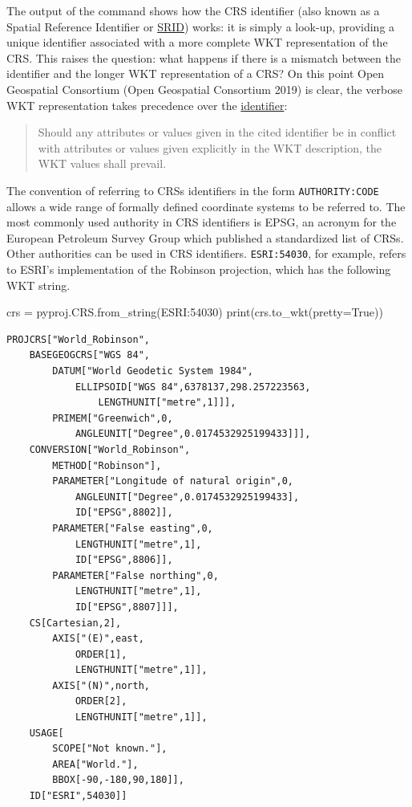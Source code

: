 \documentclass[
  letterpaper,
]{krantz}
\newenvironment{Shaded}{\begin{snugshade}}{\end{snugshade}}
\newcommand{\BuiltInTok}[1]{\textcolor[rgb]{0.00,0.23,0.31}{#1}}
\newcommand{\NormalTok}[1]{\textcolor[rgb]{0.00,0.23,0.31}{#1}}
\newcommand{\OperatorTok}[1]{\textcolor[rgb]{0.37,0.37,0.37}{#1}}
\newcommand{\StringTok}[1]{\textcolor[rgb]{0.13,0.47,0.30}{#1}}
\newcommand{\VariableTok}[1]{\textcolor[rgb]{0.07,0.07,0.07}{#1}}
\begin{document}
The output of the command shows how the CRS identifier (also known as a
Spatial Reference Identifier or
\href{https://postgis.net/workshops/postgis-intro/projection.html}{SRID})
works: it is simply a look-up, providing a unique identifier associated
with a more complete WKT representation of the CRS. This raises the
question: what happens if there is a mismatch between the identifier and
the longer WKT representation of a CRS? On this point Open Geospatial
Consortium (Open Geospatial Consortium 2019) is clear, the verbose WKT
representation takes precedence over the
\href{https://docs.opengeospatial.org/is/18-010r7/18-010r7.html\#37}{identifier}:

\begin{quote}
Should any attributes or values given in the cited identifier be in
conflict with attributes or values given explicitly in the WKT
description, the WKT values shall prevail.
\end{quote}

The convention of referring to CRSs identifiers in the form
\texttt{AUTHORITY:CODE} allows a wide range of formally defined
coordinate systems to be referred to. The most commonly used authority
in CRS identifiers is EPSG, an acronym for the European Petroleum Survey
Group which published a standardized list of CRSs. Other authorities can
be used in CRS identifiers. \texttt{ESRI:54030}, for example, refers to
ESRI's implementation of the Robinson projection, which has the
following WKT string.

\begin{Shaded}
\begin{Highlighting}[]
\NormalTok{crs }\OperatorTok{=}\NormalTok{ pyproj.CRS.from\_string(}\StringTok{\textquotesingle{}ESRI:54030\textquotesingle{}}\NormalTok{)}
\BuiltInTok{print}\NormalTok{(crs.to\_wkt(pretty}\OperatorTok{=}\VariableTok{True}\NormalTok{))}
\end{Highlighting}
\end{Shaded}

\begin{verbatim}
PROJCRS["World_Robinson",
    BASEGEOGCRS["WGS 84",
        DATUM["World Geodetic System 1984",
            ELLIPSOID["WGS 84",6378137,298.257223563,
                LENGTHUNIT["metre",1]]],
        PRIMEM["Greenwich",0,
            ANGLEUNIT["Degree",0.0174532925199433]]],
    CONVERSION["World_Robinson",
        METHOD["Robinson"],
        PARAMETER["Longitude of natural origin",0,
            ANGLEUNIT["Degree",0.0174532925199433],
            ID["EPSG",8802]],
        PARAMETER["False easting",0,
            LENGTHUNIT["metre",1],
            ID["EPSG",8806]],
        PARAMETER["False northing",0,
            LENGTHUNIT["metre",1],
            ID["EPSG",8807]]],
    CS[Cartesian,2],
        AXIS["(E)",east,
            ORDER[1],
            LENGTHUNIT["metre",1]],
        AXIS["(N)",north,
            ORDER[2],
            LENGTHUNIT["metre",1]],
    USAGE[
        SCOPE["Not known."],
        AREA["World."],
        BBOX[-90,-180,90,180]],
    ID["ESRI",54030]]
\end{verbatim}
\end{document}

